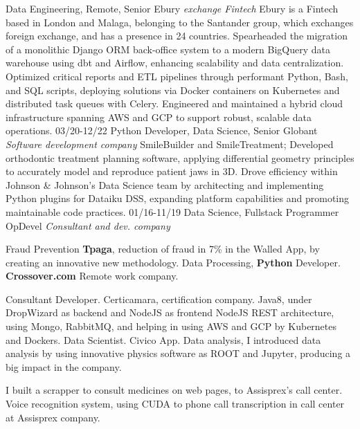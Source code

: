 \begin{entrylist}
    {Data Engineering, Remote, Senior}
    {Ebury {\sl exchange Fintech}}
    {Ebury is a Fintech based in London and Malaga, belonging to the Santander group, which exchanges
foreign exchange, and has a presence in 24 countries.
    Spearheaded the migration of a monolithic Django ORM back-office system to a modern BigQuery data
    warehouse using dbt and Airflow, enhancing scalability and data centralization. Optimized
    critical reports and ETL pipelines through performant Python, Bash, and SQL scripts, deploying
    solutions via Docker containers on Kubernetes and distributed task queues with Celery. Engineered and
    maintained a hybrid cloud infrastructure spanning AWS and GCP to support robust, scalable data operations.}
  \entry
    {03/20-12/22}
    {Python Developer, Data Science, Senior}
    {Globant {\sl Software development company}}
    {SmileBuilder and SmileTreatment; Developed orthodontic treatment planning software, applying differential
    geometry principles to accurately model and reproduce patient jaws in 3D. Drove efficiency within Johnson \&
    Johnson's Data Science team by architecting and implementing Python plugins for Dataiku DSS, expanding
    platform capabilities and promoting maintainable code practices.}
  \entry
    {01/16-11/19}
    {Data Science, Fullstack Programmer}
    {OpDevel {\sl Consultant and dev. company}}
    {Fraud Prevention \textbf{Tpaga}, reduction of fraud in 7\% in the Walled App, by creating an innovative new methodology. Data Processing, \textbf{Python} Developer. \textbf{Crossover.com} Remote work company.

Consultant Developer. Certicamara, certification company. Java8, under DropWizard as backend and NodeJS as frontend NodeJS REST architecture, using Mongo, RabbitMQ, and helping in using AWS and GCP by Kubernetes and Dockers. Data Scientist. Civico App. Data analysis, I introduced data analysis by using innovative physics software as ROOT and Jupyter, producing a big impact in
the company.

I built a scrapper to consult medicines on web pages, to Assisprex’s call center. Voice recognition system, using CUDA to phone call transcription in call center at Assisprex company.
}
\end{entrylist}

